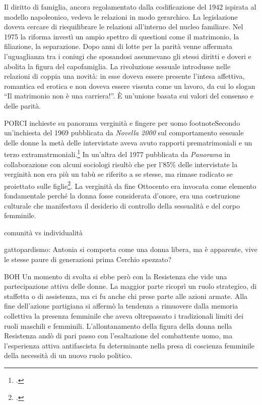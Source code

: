 Il diritto di famiglia, ancora regolamentato dalla codificazione del 1942 ispirata al modello napoleonico, vedeva le relazioni in modo gerarchico.
La legislazione doveva cercare di riequilibrare le relazioni all'interno del nucleo familiare.
Nel 1975 la riforma investì un ampio spettro di questioni come il matrimonio, la filiazione, la separazione.
Dopo anni di lotte per la parità venne affermata l'uguaglianza tra i coniugi che sposandosi assumevano gli stessi diritti e doveri e abolita la figura del capofamiglia.
La rivoluzione sessuale introdusse nelle relazioni di coppia una novità: in esse doveva essere presente l'intesa affettiva, romantica ed erotica e non doveva essere vissuta come un lavoro, da cui lo slogan \enquote{Il matrimonio non è una carriera!}.
È un'unione basata sui valori del consenso e delle parità.





PORCI
inchieste su panorama verginità e fingere per uomo
footnote{Secondo un'inchiesta del 1969 pubblicata da \textit{Novella 2000} sul comportamento sessuale delle donne la metà delle intervistate aveva avuto rapporti prematrimoniali e un terzo extramatrmoniali.\footcite{Novella}
In un'altra del 1977 pubblicata da \textit{Panorama} in collaborazione con alcuni sociologi risultò che per l'85\% delle intervistate la verginità non era più un tabù se riferito a se stesse, ma rimase radicato se proiettato sulle figlie\footcite{Balestracci3}.
La verginità da fine Ottocento era invocata come elemento fondamentale perché la donna fosse considerata d'onore, era una costruzione culturale che manifestava il desiderio di controllo della sessualità e del corpo femminile.}

comunità vs individualità

gattopardismo: Antonia si comporta come una donna libera, ma  è apparente, vive le stesse paure di generazioni prima
Cerchio spezzato?







BOH
Un momento di svolta si ebbe però con la Resistenza che vide una partecipazione attiva delle donne.
La maggior parte ricoprì un ruolo strategico, di staffetta o di assistenza, ma ci fu anche chi prese parte alle azioni armate.
Alla fine dell'azione partigiana si affermò la tendenza a rimuovere dalla memoria collettiva la presenza femminile che aveva oltrepassato i tradizionali limiti dei ruoli maschili e femminili.
L'allontanamento della figura della donna nella Resistenza andò di pari passo con l'esaltazione del combattente uomo, ma l'esperienza attiva antifascista fu determinante nella presa di coscienza femminile della necessità di un nuovo ruolo politico.

